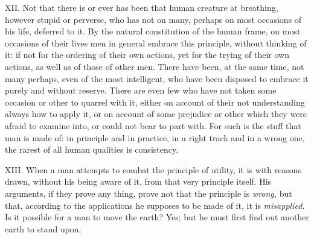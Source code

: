 \documentclass[12pt]{report}
\begin{document}
XII. Not that there is or ever has been that human creature at
breathing, however stupid or perverse, who has not on many, perhaps on
most occasions of his life, deferred to it. By the natural constitution
of the human frame, on most occasions of their lives men in general
embrace this principle, without thinking of it: if not for the ordering
of their own actions, yet for the trying of their own actions, as well
as of those of other men. There have been, at the same time, not many
perhaps, even of the most intelligent, who have been disposed to embrace
it purely and without reserve. There are even few who have not taken
some occasion or other to quarrel with it, either on account of their
not understanding always how to apply it, or on account of some
prejudice or other which they were afraid to examine into, or could not
bear to part with. For such is the stuff that man is made of: in
principle and in practice, in a right track and in a wrong one, the
rarest of all human qualities is consistency.

XIII. When a man attempts to combat the principle of utility, it is with
reasons drawn, without his being aware of it, from that very principle
itself. His arguments, if they prove any thing, prove not that the
principle is \emph{wrong,} but that, according to the applications he
supposes to be made of it, it is \emph{misapplied.} Is it possible for a
man to move the earth? Yes; but he must first find out another earth to
stand upon.
\end{document}
